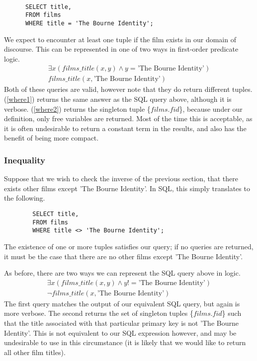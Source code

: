 \documentclass[a4paper, 11pt]{article}
\begin{document}
      \begin{verbatim}

      SELECT title,
      FROM films
      WHERE title = 'The Bourne Identity';

      \end{verbatim}

      We expect to encounter at least one tuple if the film exists in our domain
      of discourse.  This can be represented
      in one of two ways in first-order predicate logic.
      \begin{gather}
        \exists x(films\_title(x, y) \land y = \text{'The Bourne
        Identity'})\label{where1}\\
        films\_title(x, \text{'The Bourne Identity'})\label{where2}
      \end{gather}
      Both of these queries are valid, however note that they do return different
      tuples. (\ref{where1}) returns the same answer as the SQL query above, although
      it is verbose. (\ref{where2}) returns the singleton tuple \{$films.fid$\},
      because under our definition, only free variables are returned. Most of
      the time this is acceptable, as it is often undesirable to return a
      constant term in the results, and also has the benefit of being more
      compact.

    \subsubsection{Inequality}

      Suppose that we wish to check the inverse of the previous section, that
      there exists other films except 'The Bourne Identity'. In SQL, this
      simply translates to the following.

      \begin{verbatim}
        SELECT title,
        FROM films
        WHERE title <> 'The Bourne Identity';
      \end{verbatim}

      The existence of one or more tuples satisfies our query; if no queries
      are returned, it must be the case that there are no other films except
      'The Bourne Identity'.

      As before, there are two ways we can represent the SQL query above in
      logic.
      \begin{gather}
        \exists x(films\_title(x, y) \land y !=  \text{'The Bourne
        Identity'})\label{where3}\\
        \lnot films\_title(x, \text{'The Bourne Identity'})\label{where4}
      \end{gather}
      The first query matches the output of our equivalent SQL query, but again
      is more verbose. The second returns the set of singleton tuples
      \{$films.fid$\} such that the title associated with that particular
      primary key is not 'The Bourne Identity'. This is not equivalent to our
      SQL expression however, and may be undesirable to use in this
      circumstance (it is likely that we would like to return all other film
      titles).
\end{document}
